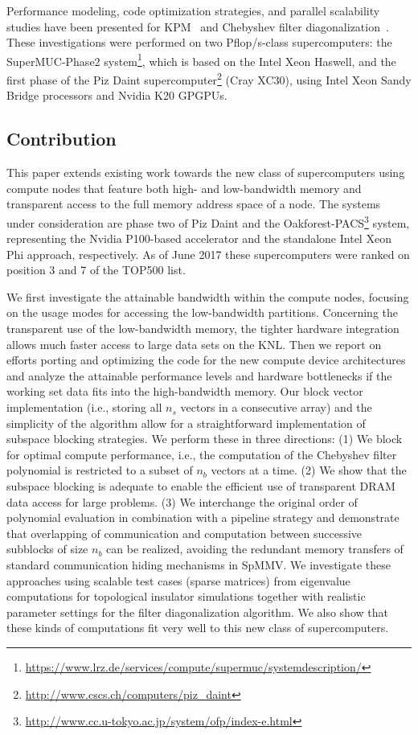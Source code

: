 \documentclass[letterpaper]{llncs}
\newcommand{\OFP}{Oakforest-PACS\xspace}
\newcommand{\second}{\mbox{s}\xspace}
\newcommand{\flop}{\mbox{flop}\xspace}
\newcommand{\PFS}{\mbox{P\flop/\second}\xspace}
\begin{document}
Performance modeling, code optimization strategies, and parallel scalability
studies have been presented
for KPM~\cite{Kreutzer15KPM} and Chebyshev filter diagonalization~\cite{Pieper15ChebFD}. These investigations were performed on two \PFS-class supercomputers: the SuperMUC-Phase2 system\footnote{\url{https://www.lrz.de/services/compute/supermuc/systemdescription/}}, which is based on the Intel Xeon Haswell, and the first phase of the Piz Daint supercomputer\footnote{\url{http://www.cscs.ch/computers/piz_daint}} (Cray XC30), using Intel Xeon Sandy Bridge processors and Nvidia K20 GPGPUs.


\subsection{Contribution}
This paper extends existing work towards the new class of supercomputers using compute nodes that feature both high- and low-bandwidth memory and transparent access to the full memory address space of a node. The systems under consideration are phase two of Piz Daint and the \OFP\footnote{\url{http://www.cc.u-tokyo.ac.jp/system/ofp/index-e.html}} system, representing the Nvidia P100-based accelerator and the standalone Intel Xeon Phi approach, respectively. As of June 2017 these supercomputers were ranked on position 3 and 7 of the TOP500 list. 

We first investigate the attainable bandwidth within the compute nodes, focusing on the usage modes for accessing the low-bandwidth partitions. Concerning the transparent use of the low-bandwidth memory, the tighter hardware integration allows much faster access to large data sets on the KNL. Then we report on efforts porting and optimizing the code for the new compute device architectures and analyze the attainable performance levels and hardware bottlenecks if the working set data fits into the high-bandwidth memory. Our block vector implementation (i.e., storing all $n_s$ vectors in a consecutive array)  and the simplicity of the algorithm allow for a straightforward implementation of subspace blocking strategies. We perform these in three directions: (1) We block for optimal compute performance, i.e., the computation of the Chebyshev filter polynomial is restricted to a subset of $n_b$ vectors at a time. (2) We show that the subspace blocking is adequate to enable the efficient use of transparent DRAM data access for large problems. (3) We interchange the original order of polynomial evaluation in combination with a pipeline strategy and demonstrate that overlapping of communication and computation between successive subblocks of size $n_b$ can be realized, avoiding the redundant memory transfers of standard communication hiding mechanisms in SpMMV. We investigate these approaches using scalable test cases (sparse matrices) from eigenvalue computations for topological insulator simulations together with realistic parameter settings for the filter diagonalization algorithm. We also show that these kinds of computations fit very well to this new class of supercomputers. 
\end{document}

